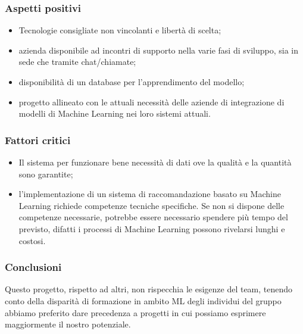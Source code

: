 	\subsubsection{Aspetti positivi}
		\begin{itemize}
			\item Tecnologie consigliate non vincolanti e libertà di scelta;
			\item azienda disponibile ad incontri di supporto nella varie fasi di sviluppo, sia in sede che tramite chat/chiamate;
			\item disponibilità di un database per l'apprendimento del modello;
			\item progetto allineato con le attuali necessità delle aziende di integrazione di modelli di Machine Learning nei loro sistemi attuali.
		\end{itemize}
		
	\subsubsection{Fattori critici}
		\begin{itemize}
			\item Il sistema per funzionare bene necessità di dati ove la qualità e la quantità sono garantite;
			\item l'implementazione di un sistema di raccomandazione basato su Machine Learning richiede competenze tecniche specifiche. Se non si dispone delle competenze necessarie, potrebbe essere necessario spendere più tempo del			previsto, difatti i processi di Machine Learning possono rivelarsi lunghi e costosi.
		\end{itemize}
		
	\subsubsection{Conclusioni}
		Questo progetto, rispetto ad altri, non rispecchia le esigenze del team, tenendo conto della disparità di formazione in ambito ML degli individui del gruppo abbiamo preferito dare precedenza a progetti in cui possiamo esprimere maggiormente il nostro		potenziale.